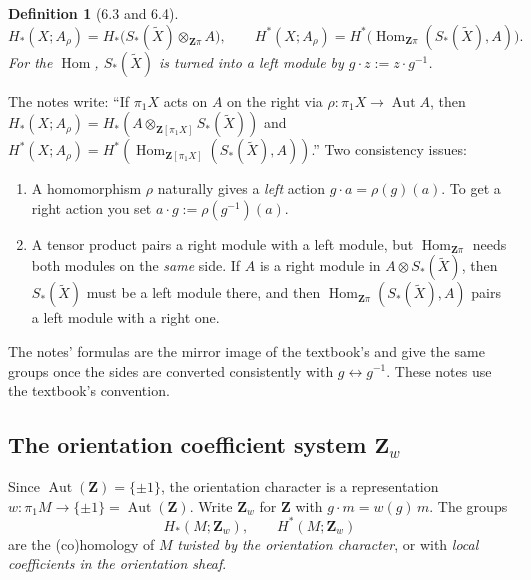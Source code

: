 \documentclass[11pt]{article}
\newcommand{\Z}{\mathbf{Z}}
\newcommand{\Xt}{\widetilde{X}}
\newcommand{\Zpi}{\Z\pi}
\DeclareMathOperator{\Hom}{Hom}
\DeclareMathOperator{\Aut}{Aut}
\theoremstyle{namedit}
\theoremstyle{namedrm}
\newtheorem{defn}{Definition}
\begin{document}
\begin{defn}[6.3 and 6.4]
\[
  H_*(X;A_\rho)=H_*\bigl(S_*(\Xt)\otimes_{\Zpi}A\bigr),\qquad
  H^*(X;A_\rho)=H^*\bigl(\Hom_{\Zpi}(S_*(\Xt),A)\bigr).
\]
For the $\Hom$, $S_*(\Xt)$ is turned into a left module by $g\cdot z:=z\cdot g^{-1}$.
\end{defn}

\begin{correction}[label=c:sides]
The notes write: ``If $\pi_1X$ acts on $A$ on the right via $\rho\colon\pi_1X\to\Aut A$, then
$H_*(X;A_\rho)=H_*(A\otimes_{\Z[\pi_1X]}S_*(\Xt))$ and
$H^*(X;A_\rho)=H^*(\Hom_{\Z[\pi_1X]}(S_*(\Xt),A))$.'' Two consistency issues:
\begin{enumerate}[label=(\roman*)]
  \item A homomorphism $\rho$ naturally gives a \emph{left} action $g\cdot a=\rho(g)(a)$. To get a right
        action you set $a\cdot g:=\rho(g^{-1})(a)$.
  \item A tensor product pairs a right module with a left module, but $\Hom_{\Zpi}$ needs both modules
        on the \emph{same} side. If $A$ is a right module in $A\otimes S_*(\Xt)$, then $S_*(\Xt)$ must be
        a left module there, and then $\Hom_{\Zpi}(S_*(\Xt),A)$ pairs a left module with a right one.
\end{enumerate}
The notes' formulas are the mirror image of the textbook's and give the same groups once the sides are
converted consistently with $g\leftrightarrow g^{-1}$. These notes use the textbook's convention.
\end{correction}

\subsection{The orientation coefficient system \texorpdfstring{$\Z_w$}{Z\_w}}
Since $\Aut(\Z)=\{\pm1\}$, the orientation character is a representation
$w\colon\pi_1M\to\{\pm1\}=\Aut(\Z)$. Write $\Z_w$ for $\Z$ with $g\cdot m=w(g)\,m$. The groups
\[
  H_*(M;\Z_w),\qquad H^*(M;\Z_w)
\]
are the (co)homology of $M$ \emph{twisted by the orientation character}, or with \emph{local
coefficients in the orientation sheaf}.
\end{document}
